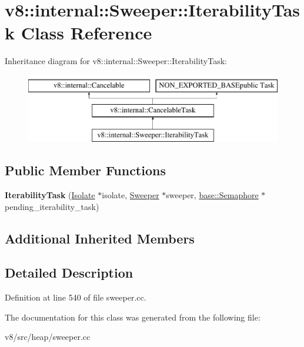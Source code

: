 \hypertarget{classv8_1_1internal_1_1Sweeper_1_1IterabilityTask}{}\section{v8\+:\+:internal\+:\+:Sweeper\+:\+:Iterability\+Task Class Reference}
\label{classv8_1_1internal_1_1Sweeper_1_1IterabilityTask}
Inheritance diagram for v8\+:\+:internal\+:\+:Sweeper\+:\+:Iterability\+Task\+:\begin{figure}[H]
\begin{center}
\leavevmode
\includegraphics[height=3.000000cm]{classv8_1_1internal_1_1Sweeper_1_1IterabilityTask}
\end{center}
\end{figure}
\subsection*{Public Member Functions}
\begin{DoxyCompactItemize}
\item 
\mbox{\label{classv8_1_1internal_1_1Sweeper_1_1IterabilityTask_a03fc2c1156c1897ac0a16d4af810b75c}} 
{\bfseries Iterability\+Task} (\mbox{\hyperlink{classv8_1_1internal_1_1Isolate}{Isolate}} $\ast$isolate, \mbox{\hyperlink{classv8_1_1internal_1_1Sweeper}{Sweeper}} $\ast$sweeper, \mbox{\hyperlink{classv8_1_1base_1_1Semaphore}{base\+::\+Semaphore}} $\ast$pending\+\_\+iterability\+\_\+task)
\end{DoxyCompactItemize}
\subsection*{Additional Inherited Members}


\subsection{Detailed Description}


Definition at line 540 of file sweeper.\+cc.



The documentation for this class was generated from the following file\+:\begin{DoxyCompactItemize}
\item 
v8/src/heap/sweeper.\+cc\end{DoxyCompactItemize}
